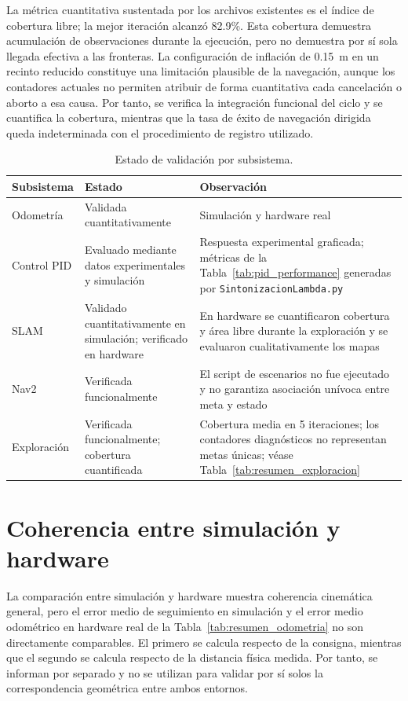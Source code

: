 La métrica cuantitativa sustentada por los archivos existentes es el índice de
cobertura libre; la mejor iteración alcanzó 82.9\%. Esta cobertura demuestra
acumulación de observaciones durante la ejecución, pero no
demuestra por sí sola llegada efectiva a las fronteras. La configuración de
inflación de 0.15~m en un recinto reducido constituye una limitación plausible
de la navegación, aunque los contadores actuales no permiten atribuir de forma
cuantitativa cada cancelación o aborto a esa causa. Por tanto, se verifica la
integración funcional del ciclo y se cuantifica la cobertura, mientras que la
tasa de éxito de navegación dirigida queda indeterminada con el procedimiento
de registro utilizado.

\begin{table}[H]
\centering
\caption{Estado de validación por subsistema.}
\label{tab:estado_validacion}
\small
\begin{tabular}{p{2.1cm} p{5.4cm} p{5.9cm}}
\toprule
\textbf{Subsistema} & \textbf{Estado} & \textbf{Observación} \\
\midrule
Odometría & Validada cuantitativamente & Simulación y hardware real \\
Control PID & Evaluado mediante datos experimentales y simulación &
Respuesta experimental graficada; métricas de la Tabla~\ref{tab:pid_performance} generadas por \texttt{SintonizacionLambda.py} \\
SLAM & Validado cuantitativamente en simulación; verificado en hardware & En hardware se cuantificaron cobertura y área libre durante la exploración y se evaluaron cualitativamente los mapas \\
Nav2 & Verificada funcionalmente & El script de escenarios no fue ejecutado y no garantiza asociación unívoca entre meta y estado \\
Exploración & Verificada funcionalmente; cobertura cuantificada & Cobertura media en 5 iteraciones; los contadores diagnósticos no representan metas únicas; véase Tabla~\ref{tab:resumen_exploracion} \\
\bottomrule
\end{tabular}
\end{table}

\section{Coherencia entre simulación y hardware}
\label{sec:comparacion_sim_real}

La comparación entre simulación y hardware muestra coherencia cinemática general, pero el error medio de seguimiento en simulación y el error medio odométrico en hardware real de la Tabla~\ref{tab:resumen_odometria} no son directamente comparables. El primero se calcula respecto de la consigna, mientras que el segundo se calcula respecto de la distancia física medida. Por tanto, se informan por separado y no se utilizan para validar por sí solos la correspondencia geométrica entre ambos entornos.

